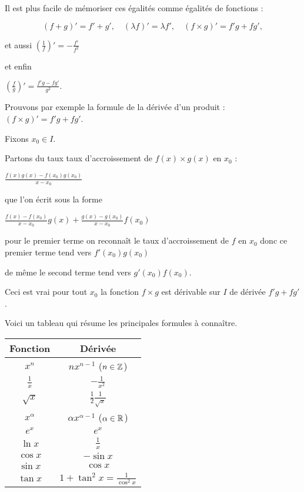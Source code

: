 Il est plus facile de mémoriser ces égalités comme égalités de fonctions :

$$(f+g)'=f'+g',\quad  (\lambda f)' = \lambda f', \quad (f \times g)' = f'g+fg', $$

\change

et aussi 
$\left(\frac{1}{f}\right)'=-\frac{f'}{f^2}$

\change

et enfin

$\left(\frac{f}{g}\right)'=\frac{f'g-fg'}{g^2}.$

\change

Prouvons par exemple la formule de la dérivée d'un produit : $(f \times g)' = f'g+fg'$.

\change

Fixons $x_0 \in I$.

\change

Partons du taux taux d'accroissement de $f(x)\times g(x)$ en $x_0$ :

$\frac{f(x)g(x)-f(x_0)g(x_0)}{x-x_0}$


\change

que l'on écrit sous la forme 

$\frac{f(x)-f(x_0)}{x-x_0} g(x)+\frac{g(x)-g(x_0)}{x-x_0}f(x_0) $

\change

pour le premier terme on reconnaît le taux d'accroissement de $f$ en $x_0$ donc ce premier terme tend vers $f'(x_0)g(x_0)$ 

de même le second terme tend vers $g'(x_0)f(x_0).$

\change 

Ceci est vrai pour tout $x_0$ la fonction $f\times g$ est dérivable sur $I$ de dérivée $f'g+fg'$.


\diapo


Voici un tableau qui résume les principales formules à connaître.


\setlength{\arrayrulewidth}{0.05mm}
\begin{tabular}[t]{|c|c@{\vrule depth 1.2ex height 3ex width 0mm \ }|} 
\hline
\textbf{Fonction}         & \textbf{Dérivée} \\ \hline
   $x^n$         & $nx^{n-1}$  \quad ($n \in \mathbb{Z}$)   \\ \hline
   $\frac 1x$    & $-\frac{1}{x^2}$              \\ \hline
   $\sqrt{x}$    & $\frac12 \frac1{\sqrt{x}}$   \\ \hline
   $x^\alpha$   & $\alpha x^{\alpha-1}$  \quad ($\alpha\in\mathbb{R}$)  \\ \hline
   $e^x$         & $e^x$                        \\ \hline
   $\ln x$       & $\frac 1x$                   \\ \hline
   $\cos x$      & $-\sin x$                    \\ \hline
   $\sin x$      & $\cos x$                     \\ \hline
   $\tan x$      & $1+\tan^2 x = \frac{1}{\cos^2 x}$        \\ \hline
\end{tabular} 


